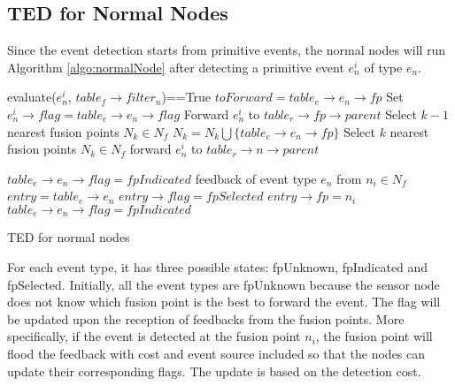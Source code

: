 \subsection{TED for Normal Nodes}
Since the event detection starts from primitive events, the normal nodes will run Algorithm \ref{algo:normalNode} after detecting a primitive event \(e^i_n\) of type \(e_n\).
\begin{algorithm}
\begin{algorithmic}[1]
\REQUIRE evaluate(\(e^i_n\), \(table_f\rightarrow filter_n\))==True
		\STATE \(toForward=table_e\rightarrow e_n\rightarrow fp\)
		\STATE Set \(e^i_n\rightarrow flag=table_e\rightarrow e_n\rightarrow flag\)
		\STATE Forward \(e^i_n\) to \(table_r\rightarrow fp\rightarrow parent\)
	\ELSE
			\STATE Select \(k-1\) nearest fusion points \(N_k\in N_f\)
			\STATE \(N_k=N_k\bigcup \{table_e\rightarrow e_n\rightarrow fp\}\)
		\ELSE
			\STATE Select \(k\) nearest fusion points \(N_k\in N_f\)
		\ENDIF
			\STATE forward \(e^i_n\) to \(table_r\rightarrow n\rightarrow parent\)
		\ENDFOR
	\ENDIF
	
		\STATE \(table_e\rightarrow e_n\rightarrow flag=fpIndicated\)
	\ENDIF
\REQUIRE feedback of event type \(e_n\) from \(n_i\in N_f\)
	\STATE \(entry=table_e\rightarrow e_n\)
		\STATE \(entry\rightarrow flag=fpSelected\)
		\STATE \(entry\rightarrow fp=n_i\)
		\STATE \(table_e\rightarrow e_n\rightarrow flag=fpIndicated\)
	\ENDIF
\end{algorithmic}
\caption{TED for normal nodes}
\label{algo:normalNode}
\end{algorithm}
For each event type, it has three possible states: fpUnknown, fpIndicated and fpSelected. Initially, all the event types are fpUnknown because the sensor node does not know which fusion point is the best to forward the event. The flag will be updated upon the reception of feedbacks from the fusion points. More specifically, if the event is detected at the fusion point \(n_i\), the fusion point will flood the feedback with cost and event source included so that the nodes can update their corresponding flags. The update is based on the detection cost.

